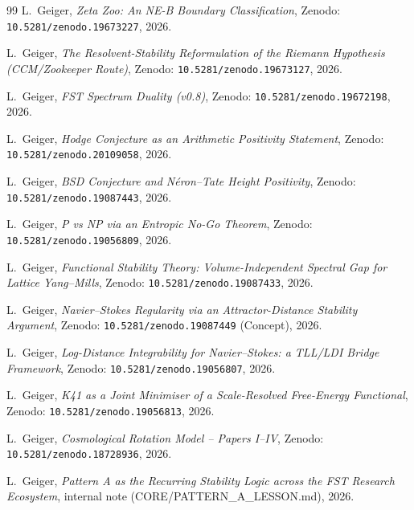 \documentclass[11pt,a4paper]{article}
\theoremstyle{remark}
\begin{document}
\begin{thebibliography}{99}
L.~Geiger,
\emph{Zeta Zoo: An NE-B Boundary Classification},
Zenodo: \texttt{10.5281/zenodo.19673227}, 2026.

L.~Geiger,
\emph{The Resolvent-Stability Reformulation of the Riemann Hypothesis
(CCM/Zookeeper Route)},
Zenodo: \texttt{10.5281/zenodo.19673127}, 2026.

L.~Geiger,
\emph{FST Spectrum Duality (v0.8)},
Zenodo: \texttt{10.5281/zenodo.19672198}, 2026.

L.~Geiger,
\emph{Hodge Conjecture as an Arithmetic Positivity Statement},
Zenodo: \texttt{10.5281/zenodo.20109058}, 2026.

L.~Geiger,
\emph{BSD Conjecture and Néron--Tate Height Positivity},
Zenodo: \texttt{10.5281/zenodo.19087443}, 2026.

L.~Geiger,
\emph{P vs NP via an Entropic No-Go Theorem},
Zenodo: \texttt{10.5281/zenodo.19056809}, 2026.

L.~Geiger,
\emph{Functional Stability Theory: Volume-Independent Spectral Gap
for Lattice Yang--Mills},
Zenodo: \texttt{10.5281/zenodo.19087433}, 2026.

L.~Geiger,
\emph{Navier--Stokes Regularity via an Attractor-Distance
Stability Argument},
Zenodo: \texttt{10.5281/zenodo.19087449} (Concept), 2026.

L.~Geiger,
\emph{Log-Distance Integrability for Navier--Stokes: a TLL/LDI
Bridge Framework},
Zenodo: \texttt{10.5281/zenodo.19056807}, 2026.

L.~Geiger,
\emph{K41 as a Joint Minimiser of a Scale-Resolved Free-Energy
Functional},
Zenodo: \texttt{10.5281/zenodo.19056813}, 2026.

L.~Geiger,
\emph{Cosmological Rotation Model -- Papers I--IV},
Zenodo: \texttt{10.5281/zenodo.18728936}, 2026.

L.~Geiger,
\emph{Pattern A as the Recurring Stability Logic across the FST
Research Ecosystem}, internal note (CORE/PATTERN\_A\_LESSON.md),
2026.

\end{thebibliography}
\end{document}
